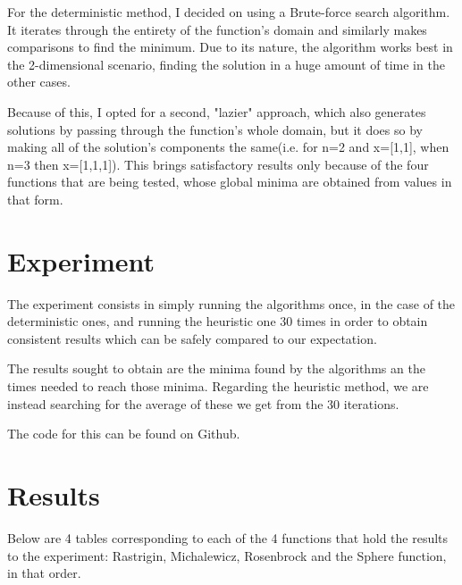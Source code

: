 \documentclass{article}
\begin{document}
For the deterministic method, I decided on using a Brute-force search algorithm. It iterates through the entirety of the function's domain and similarly makes comparisons to find the minimum. Due to its nature, the algorithm works best in the 2-dimensional scenario, finding the solution in a huge amount of time in the other cases.

Because of this, I opted for a second, "lazier" approach, which also generates solutions by passing through the function's whole domain, but it does so by making all of the solution's components the same(i.e. for n=2 and x=[1,1], when n=3 then x=[1,1,1]). This brings satisfactory results only because of the four functions that are being tested, whose global minima are obtained from values in that form.


\section{Experiment}
The experiment consists in simply running the algorithms once, in the case of the deterministic ones, and running the heuristic one 30 times in order to obtain consistent results which can be safely compared to our expectation. 

The results sought to obtain are the minima found by the algorithms an the times needed to reach those minima. Regarding the heuristic method, we are instead searching for the average of these we get from the 30 iterations.

The code for this can be found on Github.\cite{github}

\section{Results}
Below are 4 tables corresponding to each of the 4 functions that hold the results to the experiment: Rastrigin, Michalewicz, Rosenbrock and the Sphere function, in that order.

\newpage
\end{document}

